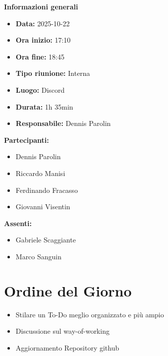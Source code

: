 \documentclass[a4paper,12pt]{article}
\begin{document}
\clearpage
{\large \textbf{Informazioni generali}}
{\footnotesize
{}

\begin{itemize}
    \item \textbf{Data:} 2025-10-22
    \item \textbf{Ora inizio:} 17:10
    \item \textbf{Ora fine:} 18:45
    \item \textbf{Tipo riunione:} Interna
    \item \textbf{Luogo:} Discord
    \item \textbf{Durata:} 1h 35min
    \item \textbf{Responsabile:} Dennis Parolin
\end{itemize}

\vspace{0.2cm}

\textbf{Partecipanti:}
\begin{itemize}
    \item Dennis Parolin
    \item Riccardo Manisi
    \item Ferdinando Fracasso
    \item Giovanni Visentin
\end{itemize}

\textbf{Assenti:}
\begin{itemize}
    \item Gabriele Scaggiante
    \item Marco Sanguin
\end{itemize}
}

\vspace{0.5cm}

\vspace{0.8cm}

\clearpage
\tableofcontents
\thispagestyle{empty} %
\clearpage

\section{Ordine del Giorno}
\begin{itemize}
    \item Stilare un To-Do meglio organizzato e più ampio
    \item Discussione sul way-of-working
    \item Aggiornamento Repository github
\end{itemize}
\end{document}
